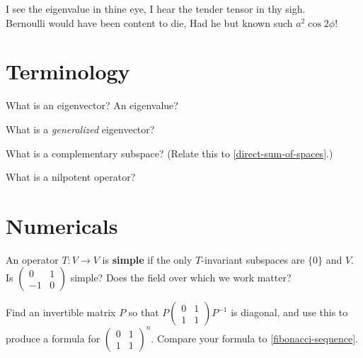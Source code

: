 \documentclass{homework}
\author{Jim Fowler}
\begin{document}
\maketitle

\begin{inspiration}
I see the eigenvalue in thine eye, 
I hear the tender tensor in thy sigh. \\
Bernoulli would have been content to die,
Had he but known such $a^2 \cos 2 \phi$! \\
\end{inspiration}

\section{Terminology}

\begin{problem}
  What is an eigenvector?  An eigenvalue?
\end{problem}

\begin{problem}
  What is a \textit{generalized} eigenvector?
\end{problem}

\begin{problem}
  What is a complementary subspace?  (Relate this to \ref{direct-sum-of-spaces}.)
\end{problem}

\begin{problem}
  What is a nilpotent operator?
\end{problem}

\section{Numericals}


\begin{problem}
  An operator $T : V \to V$ is \textbf{simple} if the only $T$-invariant subspaces are $\{0\}$ and $V$.  Is  $\begin{pmatrix} 0 & 1 \\ -1 & 0 \end{pmatrix}$ simple?  Does the field over which we work matter?
\end{problem}

\begin{problem}
  Find an invertible matrix $P$ so that
  \(
    P \begin{pmatrix}
      0 & 1 \\
      1 & 1 
    \end{pmatrix} P^{-1}
  \)
  is diagonal, and use this to produce a formula for $\begin{pmatrix}
      0 & 1 \\
      1 & 1 
    \end{pmatrix}^n$.  Compare your formula to \ref{fibonacci-sequence}.
\end{problem}
\end{document}
